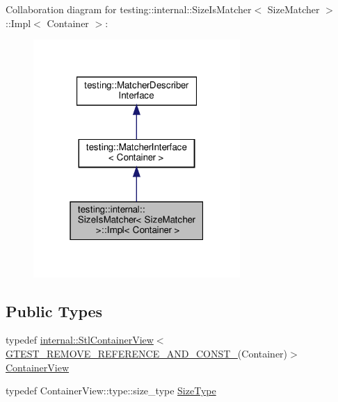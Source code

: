 Collaboration diagram for testing\+:\+:internal\+:\+:Size\+Is\+Matcher$<$ Size\+Matcher $>$\+:\+:Impl$<$ Container $>$\+:
\nopagebreak
\begin{figure}[H]
\begin{center}
\leavevmode
\includegraphics[width=223pt]{classtesting_1_1internal_1_1_size_is_matcher_1_1_impl__coll__graph}
\end{center}
\end{figure}
\subsection*{Public Types}
\begin{DoxyCompactItemize}
\item 
typedef \hyperlink{classtesting_1_1internal_1_1_stl_container_view}{internal\+::\+Stl\+Container\+View}$<$ \hyperlink{gtest-internal_8h_a874567b176266188fabfffb8393267ce}{G\+T\+E\+S\+T\+\_\+\+R\+E\+M\+O\+V\+E\+\_\+\+R\+E\+F\+E\+R\+E\+N\+C\+E\+\_\+\+A\+N\+D\+\_\+\+C\+O\+N\+S\+T\+\_\+}(Container)$>$ \hyperlink{classtesting_1_1internal_1_1_size_is_matcher_1_1_impl_ae848755998eaaaa5e38366a2fc8b55e2}{Container\+View}
\item 
typedef Container\+View\+::type\+::size\+\_\+type \hyperlink{classtesting_1_1internal_1_1_size_is_matcher_1_1_impl_a5548da0c4c2245ca2fb520f44f0a687a}{Size\+Type}
\end{DoxyCompactItemize}
